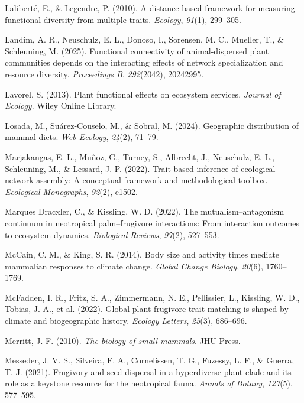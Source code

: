 \documentclass[
]{agujournal2019}
\newlength{\cslhangindent}
\newenvironment{CSLReferences}[2] %
 {\begin{list}{}{%
  \setlength{\itemindent}{0pt}
  \setlength{\leftmargin}{0pt}
  \setlength{\parsep}{0pt}
  \ifodd #1
   \setlength{\leftmargin}{\cslhangindent}
   \setlength{\itemindent}{-1\cslhangindent}
  \fi
  \setlength{\itemsep}{#2\baselineskip}}}
 {\end{list}}
\begin{document}
\begin{CSLReferences}{1}{0}
Laliberté, E., \& Legendre, P. (2010). A distance-based framework for
measuring functional diversity from multiple traits. \emph{Ecology},
\emph{91}(1), 299--305.

Landim, A. R., Neuschulz, E. L., Donoso, I., Sorensen, M. C., Mueller,
T., \& Schleuning, M. (2025). Functional connectivity of
animal-dispersed plant communities depends on the interacting effects of
network specialization and resource diversity. \emph{Proceedings B},
\emph{292}(2042), 20242995.

Lavorel, S. (2013). Plant functional effects on ecosystem services.
\emph{Journal of Ecology}. Wiley Online Library.

Losada, M., Suárez-Couselo, M., \& Sobral, M. (2024). Geographic
distribution of mammal diets. \emph{Web Ecology}, \emph{24}(2), 71--79.

Marjakangas, E.-L., Muñoz, G., Turney, S., Albrecht, J., Neuschulz, E.
L., Schleuning, M., \& Lessard, J.-P. (2022). Trait-based inference of
ecological network assembly: A conceptual framework and methodological
toolbox. \emph{Ecological Monographs}, \emph{92}(2), e1502.

Marques Dracxler, C., \& Kissling, W. D. (2022). The
mutualism--antagonism continuum in neotropical palm--frugivore
interactions: From interaction outcomes to ecosystem dynamics.
\emph{Biological Reviews}, \emph{97}(2), 527--553.

McCain, C. M., \& King, S. R. (2014). Body size and activity times
mediate mammalian responses to climate change. \emph{Global Change
Biology}, \emph{20}(6), 1760--1769.

McFadden, I. R., Fritz, S. A., Zimmermann, N. E., Pellissier, L.,
Kissling, W. D., Tobias, J. A., et al. (2022). Global plant-frugivore
trait matching is shaped by climate and biogeographic history.
\emph{Ecology Letters}, \emph{25}(3), 686--696.

Merritt, J. F. (2010). \emph{The biology of small mammals}. JHU Press.

Messeder, J. V. S., Silveira, F. A., Cornelissen, T. G., Fuzessy, L. F.,
\& Guerra, T. J. (2021). Frugivory and seed dispersal in a hyperdiverse
plant clade and its role as a keystone resource for the neotropical
fauna. \emph{Annals of Botany}, \emph{127}(5), 577--595.


\end{CSLReferences}
\end{document}
